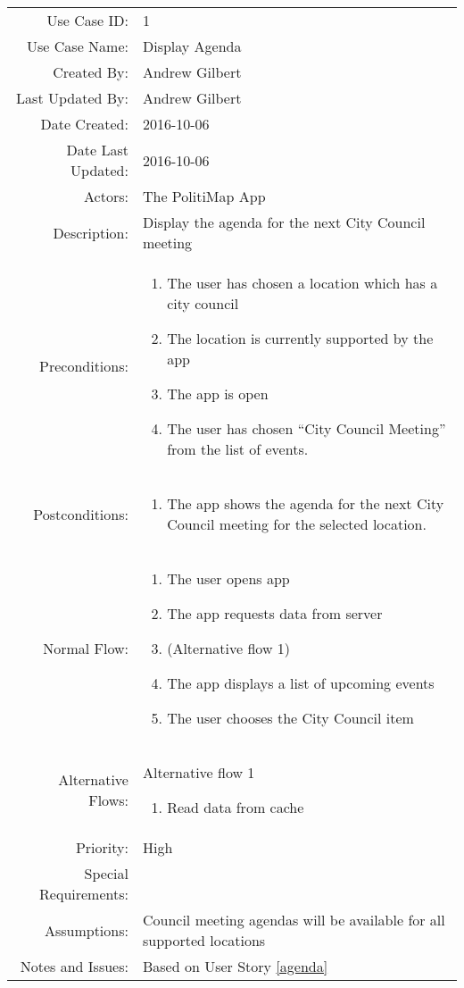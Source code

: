\documentclass{article}
\begin{document}
\begin{tabu}{rX}
  \toprule
  Use Case ID: & 1\\
  Use Case Name: & Display Agenda\\
  Created By: & Andrew Gilbert\\
  Last Updated By: & Andrew Gilbert\\
  Date Created: & 2016-10-06\\
  Date Last Updated: & 2016-10-06\\
  Actors: & The PolitiMap App\\
  Description: & Display the agenda for the next City Council meeting\\
  Preconditions: &
  \begin{enumerate}
  \item The user has chosen a location which has a city council
  \item The location is currently supported by the app
  \item The app is open
  \item The user has chosen ``City Council Meeting'' from the list of events.
  \end{enumerate} \\
  Postconditions: &
  \begin{enumerate}
  \item The app shows the agenda for the next City Council meeting for
    the selected location.
  \end{enumerate} \\
  Normal Flow: &
  \begin{enumerate}
  \item The user opens app
  \item The app requests data from server
  \item (Alternative flow 1)
  \item The app displays a list of upcoming events
  \item The user chooses the City Council item
  \end{enumerate} \\
  Alternative Flows: &
  Alternative flow 1
  \begin{enumerate}
  \item Read data from cache
  \end{enumerate} \\
  Priority: & High\\
  Special Requirements: & \\
  Assumptions: & Council meeting agendas will be available for all
  supported locations\\
  Notes and Issues: & Based on User Story \vref{agenda}\\
  \bottomrule
\end{tabu}
\end{document}
